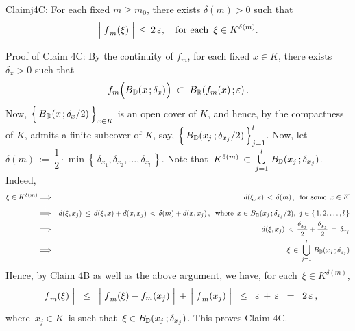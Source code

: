 \vskip 0.8cm
\begin{center}\begin{minipage}{6.5in}
\underline{Claim{{\color{white}j}}4C:}\;\;
For each fixed $m \geq m_{0}$, there exists $\delta(m) > 0$ such that
\begin{equation*}
\left\vert\;\overset{{\color{white}.}}{f}_{m}(\xi)\;\right\vert \,\leq\,  2\,\varepsilon,
\quad
\textnormal{for each \,$\xi \in K^{\delta(m)}$}.
\end{equation*}
\end{minipage}\end{center}
Proof of Claim 4C:\;\;
By the continuity of $f_{m}$, for each fixed $x \in K$, there exists
$\delta_{x} > 0$ such that
\begin{equation*}
f_{m}\!\left(\overset{{\color{white}.}}{B}_{\D}(x\,;\delta_{x})\right)
\; \subset \;
	B_{\Re}\!\left(f_{m}(x)\,;\varepsilon\right).
\end{equation*}
Now, $\left\{\, \overset{{\color{white}.}}{B}_{\D}(x\,;\delta_{x}/2) \,\right\}_{x \in K}$
is an open cover of $K$, and hence, by the compactness of $K$, admits a finite
subcover of $K$, say,
$\left\{\, \overset{{\color{white}.}}{B}_{\D}(x_{j}\,;\delta_{x_{j}}/2) \,\right\}_{j = 1}^{l}$.
Now, let
\,$\delta(m) \,:=\, \dfrac{1}{2}\cdot\min\!\left\{\,\delta_{x_{1}},\delta_{x_{2}},\ldots,\delta_{x_{l}}\,\right\}$.
Note that
\,$K^{\delta(m)} \,\subset\, \overset{l}{\underset{j=1}{\bigcup}} \; B_{\mathbb{D}}(x_{j}\,;\delta_{x_{j}})$.
Indeed,
\begin{eqnarray*}
\xi \in K^{\delta(m)}
&\Longrightarrow&
	d(\xi,x) \,<\, \delta(m)\,, \;\;\textnormal{for some \,$x \in K$}
\\
&\overset{{\color{white}\overset{.}{1}}}{\Longrightarrow}&
	d(\xi,x_{j}) \,\leq\, d(\xi,x) + d(x,x_{j}) \,<\, \delta(m) + d(x,x_{j})\,,
	\;\;\textnormal{where \,$x \in B_{\D}(x_{j}\,;\delta_{x_{j}}/2)$, \,$j\in\{\,1,2,\ldots,l\,\}$}
\\
&\Longrightarrow&
	d(\xi,x_{j}) \,<\, \dfrac{\delta_{x_{j}}}{2} + \dfrac{\delta_{x_{j}}}{2} \,=\, \delta_{x_{j}}
\\
&\Longrightarrow&
	\xi \,\in\, \overset{l}{\underset{j=1}{\bigcup}} \; B_{\D}(x_{j}\,;\delta_{x_{j}})
\end{eqnarray*}
Hence, by Claim 4B as well as the above argument, we have, for each \,$\xi \in K^{\delta(m)}$,
\begin{equation*}
\left\vert\;\overset{{\color{white}.}}{f}_{m}(\xi)\;\right\vert
\;\; \leq \;\;
	\left\vert\;\overset{{\color{white}.}}{f}_{m}(\xi) - f_{m}(x_{j})\;\right\vert
	\,+\,
	\left\vert\;\overset{{\color{white}.}}{f}_{m}(x_{j})\;\right\vert
\;\; \leq \;\;
	\varepsilon \,+\, \varepsilon 
\;\; = \;\;
	2\,\varepsilon\,,
\end{equation*}
where \,$x_{j} \in K$\, is such that \,$\xi \in B_{\mathbb{D}}(x_{j}\,;\delta_{x_{j}})$.
This proves Claim 4C.

